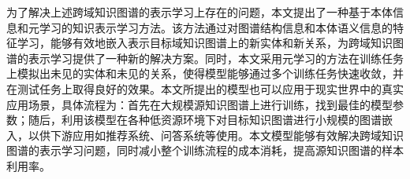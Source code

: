为了解决上述跨域知识图谱的表示学习上存在的问题，本文提出了一种基于本体信息和元学习的知识表示学习方法。该方法通过对图谱结构信息和本体语义信息的特征学习，能够有效地嵌入表示目标域知识图谱上的新实体和新关系，为跨域知识图谱的表示学习提供了一种新的解决方案。同时，本文采用元学习的方法在训练任务上模拟出未见的实体和未见的关系，使得模型能够通过多个训练任务快速收敛，并在测试任务上取得良好的效果。本文所提出的模型也可以应用于现实世界中的真实应用场景，具体流程为：首先在大规模源知识图谱上进行训练，找到最佳的模型参数；随后，利用该模型在各种低资源环境下对目标知识图谱进行小规模的图谱嵌入，以供下游应用如推荐系统、问答系统等使用。本文模型能够有效解决跨域知识图谱的表示学习问题，同时减小整个训练流程的成本消耗，提高源知识图谱的样本利用率。




